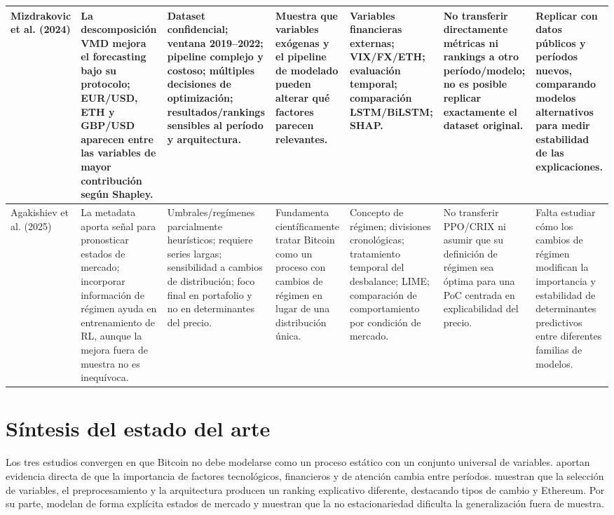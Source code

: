 \documentclass[11pt,letterpaper]{article}
\begin{document}
{\begin{landscape}
\begin{longtable}{p{1.55cm} p{3.3cm} p{4.1cm} p{3.25cm} p{3.0cm} p{3.0cm} p{3.9cm}}
Mizdrakovic et al. (2024) &
La descomposición VMD mejora el forecasting bajo su protocolo; EUR/USD, ETH y GBP/USD aparecen entre las variables de mayor contribución según Shapley. &
Dataset confidencial; ventana 2019--2022; pipeline complejo y costoso; múltiples decisiones de optimización; resultados/rankings sensibles al período y arquitectura. &
Muestra que variables exógenas y el pipeline de modelado pueden alterar qué factores parecen relevantes. &
Variables financieras externas; VIX/FX/ETH; evaluación temporal; comparación LSTM/BiLSTM; SHAP. &
No transferir directamente métricas ni rankings a otro período/modelo; no es posible replicar exactamente el dataset original. &
Replicar con datos públicos y períodos nuevos, comparando modelos alternativos para medir estabilidad de las explicaciones. \\
\midrule

Agakishiev et al. (2025) &
La metadata aporta señal para pronosticar estados de mercado; incorporar información de régimen ayuda en entrenamiento de RL, aunque la mejora fuera de muestra no es inequívoca. &
Umbrales/regímenes parcialmente heurísticos; requiere series largas; sensibilidad a cambios de distribución; foco final en portafolio y no en determinantes del precio. &
Fundamenta científicamente tratar Bitcoin como un proceso con cambios de régimen en lugar de una distribución única. &
Concepto de régimen; divisiones cronológicas; tratamiento temporal del desbalance; LIME; comparación de comportamiento por condición de mercado. &
No transferir PPO/CRIX ni asumir que su definición de régimen sea óptima para una PoC centrada en explicabilidad del precio. &
Falta estudiar cómo los cambios de régimen modifican la importancia y estabilidad de determinantes predictivos entre diferentes familias de modelos. \\
\bottomrule
\end{longtable}
\end{landscape}
}

\section{Síntesis del estado del arte}

Los tres estudios convergen en que Bitcoin no debe modelarse como un proceso estático con un conjunto universal de variables. \textcite{carbo2024} aportan evidencia directa de que la importancia de factores tecnológicos, financieros y de atención cambia entre períodos. \textcite{mizdrakovic2024} muestran que la selección de variables, el preprocesamiento y la arquitectura producen un ranking explicativo diferente, destacando tipos de cambio y Ethereum. Por su parte, \textcite{agakishiev2025} modelan de forma explícita estados de mercado y muestran que la no estacionariedad dificulta la generalización fuera de muestra.
\end{document}
